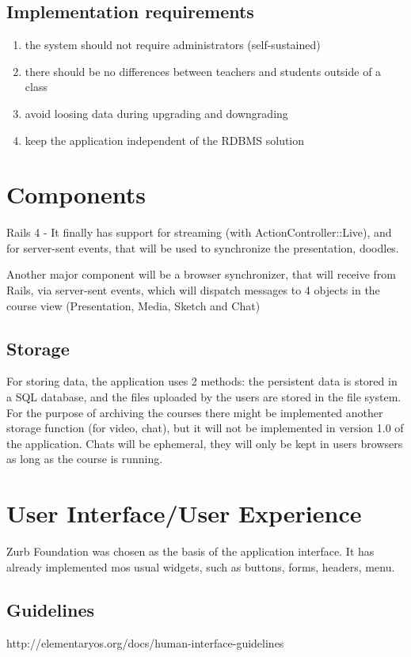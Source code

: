 \subsection{Implementation requirements}
\begin{enumerate}
\item the system should not require administrators (self-sustained)
\item there should be no differences between teachers and students outside of a
class
\item avoid loosing data during upgrading and downgrading
\item keep the application independent of the RDBMS solution
\end{enumerate}

\section{Components}
Rails 4 - It finally has support for streaming (with ActionController::Live),
and for server-sent events, that will be used to synchronize the presentation,
doodles.

Another major component will be a browser synchronizer, that will receive
from Rails, via server-sent events, which will dispatch messages to 4 objects
in the course view (Presentation, Media, Sketch and Chat)

\subsection{Storage}
For storing data, the application uses 2 methods: the persistent data is stored
in a SQL database, and the files uploaded by the users are stored in the
file system. For the purpose of archiving the courses there might be implemented
another storage function (for video, chat), but it will not be implemented in
version 1.0 of the application. Chats will be ephemeral, they will only be kept
in users browsers as long as the course is running.

\section{User Interface/User Experience}
Zurb Foundation was chosen as the basis of the application interface. It has
already implemented mos usual widgets, such as buttons, forms, headers, menu.
\subsection{Guidelines}
http://elementaryos.org/docs/human-interface-guidelines

